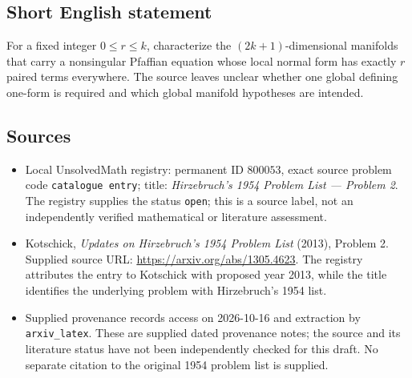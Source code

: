 \documentclass[11pt]{article}
\begin{document}
\subsection{Short English statement}
For a fixed integer \(0\leq r\leq k\), characterize the \((2k+1)\)-dimensional manifolds that carry a nonsingular Pfaffian equation whose local normal form has exactly \(r\) paired terms everywhere. The source leaves unclear whether one global defining one-form is required and which global manifold hypotheses are intended.
\subsection{Sources}
\begin{itemize}
\item Local UnsolvedMath registry: permanent ID \(800053\), exact source problem code \texttt{catalogue entry}; title: \emph{Hirzebruch's 1954 Problem List --- Problem 2}. The registry supplies the status \texttt{open}; this is a source label, not an independently verified mathematical or literature assessment.
\item Kotschick, \emph{Updates on Hirzebruch's 1954 Problem List} (2013), Problem 2. Supplied source URL: \url{https://arxiv.org/abs/1305.4623}. The registry attributes the entry to Kotschick with proposed year 2013, while the title identifies the underlying problem with Hirzebruch's 1954 list.
\item Supplied provenance records access on 2026-10-16 and extraction by \texttt{arxiv\_latex}. These are supplied dated provenance notes; the source and its literature status have not been independently checked for this draft. No separate citation to the original 1954 problem list is supplied.
\end{itemize}
\end{document}
